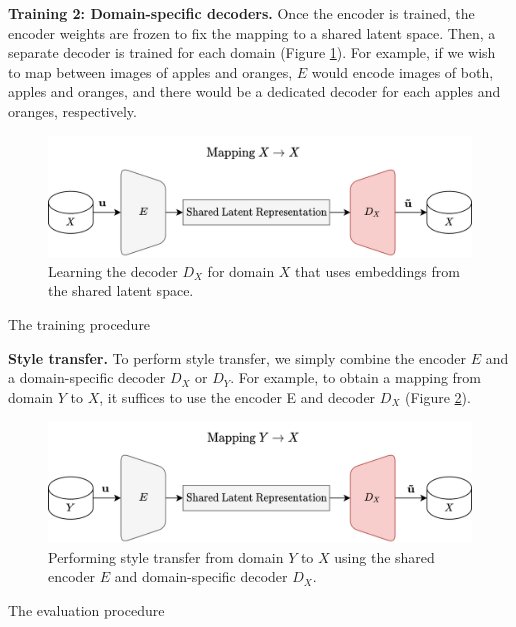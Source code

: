 \documentclass{article}
\begin{document}
\textbf{Training 2: Domain-specific decoders.} Once the encoder is trained, the encoder weights are frozen to fix the mapping to a shared latent space. Then, a separate decoder is trained for each domain (Figure \ref{fig:train}). For example, if we wish to map between images of apples and oranges, $E$ would encode images of both, apples and oranges, and there would be a dedicated decoder for each apples and oranges, respectively. 
\begin{figure}[H]
  \centering
  \includegraphics[width=0.8\linewidth]{report/assets/train.png}
  \caption{Learning the decoder $D_X$ for domain $X$ that uses embeddings from the shared latent space.}
  \label{fig:train}
\end{figure}
\begin{algorithm}[H]
  \caption{The training procedure}\label{alg:train}
  \begin{algorithmic}
    
    
    \end{algorithmic}
\end{algorithm}

\textbf{Style transfer.} To perform style transfer, we simply combine the encoder $E$ and a domain-specific decoder $D_X$ or $D_Y$. For example, to obtain a mapping from domain $Y$ to $X$, it suffices to use the encoder E and decoder $D_X$ (Figure \ref{fig:eval}).

\begin{figure}
  \centering
  \includegraphics[width=0.8\linewidth]{report/assets/eval.png}
  \caption{Performing style transfer from domain $Y$ to $X$ using the shared encoder $E$ and domain-specific decoder $D_X$.}
  \label{fig:eval}
\end{figure}
\begin{algorithm}[H]
  \caption{The evaluation procedure}\label{alg:eval}
  \begin{algorithmic}
  \end{algorithmic}
\end{algorithm}
\end{document}
